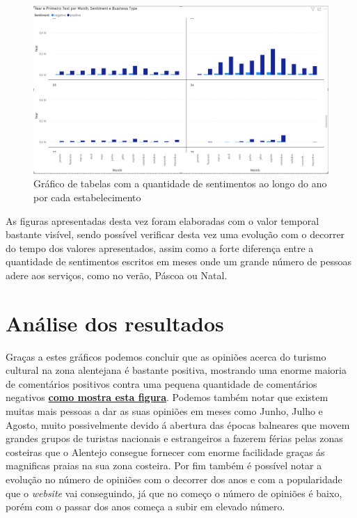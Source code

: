 \begin{figure}[!htb]
\centering
\includegraphics[width=16cm]{figuras/Pos&NegSentimentsPerMonth&BusinessType/2.PNG}
\caption{Gráfico de tabelas com a quantidade de sentimentos ao longo do ano por cada estabelecimento}
\label{fig:sentvarbejatimed}
\end{figure}

As figuras apresentadas desta vez foram elaboradas com o valor temporal bastante visível, sendo possível verificar desta vez uma evolução com o decorrer do tempo dos valores apresentados, assim como a forte diferença entre a quantidade de sentimentos escritos em meses onde um grande número de pessoas adere aos serviços, como no verão, Páscoa ou Natal.

\section {Análise dos resultados}

Graças a estes gráficos podemos concluir que as opiniões acerca do turismo cultural na zona alentejana é bastante positiva, mostrando uma enorme maioria de comentários positivos contra uma pequena quantidade de comentários negativos \hyperref[fig:sentvarbejatimed]{\textbf{como mostra esta figura}}. Podemos também notar que existem muitas mais pessoas a dar as suas opiniões em meses como Junho, Julho e Agosto, muito possivelmente devido á abertura das épocas balneares que movem grandes grupos de turistas nacionais e estrangeiros a fazerem férias pelas zonas costeiras que o Alentejo consegue fornecer com enorme facilidade graças ás magnificas praias na sua zona costeira. Por fim também é possível notar a evolução no número de opiniões com o decorrer dos anos e com a popularidade que o \textit{website} vai conseguindo, já que no começo o número de opiniões é baixo, porém com o passar dos anos começa a subir em elevado número.

